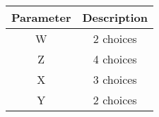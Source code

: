 

\providecommand{\pr}[1]{\ensuremath{\Pr\left(#1\right)}}


\begin{center}
\large \begin{tabular}{|c|c|}
\hline
     Parameter  & Description \\
     \hline 
     W  & 2 choices \\
     \hline
     Z & 4 choices\\
     \hline
     X & 3 choices \\
     \hline
     Y & 2 choices \\
     \hline
 \end{tabular} 
 \end{center}



